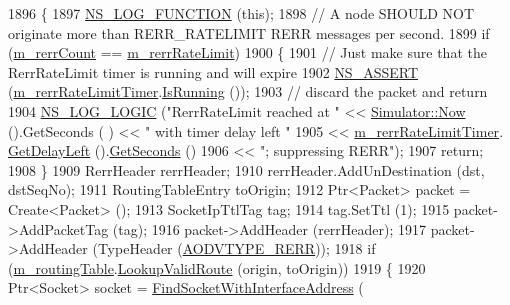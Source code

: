 \begin{DoxyCode}
1896 \{
1897   \hyperlink{log-macros-disabled_8h_a90b90d5bad1f39cb1b64923ea94c0761}{NS\_LOG\_FUNCTION} (\textcolor{keyword}{this});
1898   \textcolor{comment}{// A node SHOULD NOT originate more than RERR\_RATELIMIT RERR messages per second.}
1899   \textcolor{keywordflow}{if} (\hyperlink{classns3_1_1aodv_1_1RoutingProtocol_a4afc71535ffd2ea1bd7dcb03e3fd4233}{m\_rerrCount} == \hyperlink{classns3_1_1aodv_1_1RoutingProtocol_ad7a69761e61bcea41a2bc87ad8928e2d}{m\_rerrRateLimit})
1900     \{
1901       \textcolor{comment}{// Just make sure that the RerrRateLimit timer is running and will expire}
1902       \hyperlink{assert_8h_a6dccdb0de9b252f60088ce281c49d052}{NS\_ASSERT} (\hyperlink{classns3_1_1aodv_1_1RoutingProtocol_a0eaa679b6dea15e92c550591eabbccc1}{m\_rerrRateLimitTimer}.\hyperlink{classns3_1_1Timer_addbc6c740f21ddeb6ad358557962b24c}{IsRunning} ());
1903       \textcolor{comment}{// discard the packet and return}
1904       \hyperlink{group__logging_ga88acd260151caf2db9c0fc84997f45ce}{NS\_LOG\_LOGIC} (\textcolor{stringliteral}{"RerrRateLimit reached at "} << \hyperlink{classns3_1_1Simulator_ac3178fa975b419f7875e7105be122800}{Simulator::Now} ().GetSeconds (
      ) << \textcolor{stringliteral}{" with timer delay left "} 
1905                                                 << \hyperlink{classns3_1_1aodv_1_1RoutingProtocol_a0eaa679b6dea15e92c550591eabbccc1}{m\_rerrRateLimitTimer}.
      \hyperlink{classns3_1_1Timer_a0dc288dd3de21a524d088fc8a5a14a73}{GetDelayLeft} ().\hyperlink{classns3_1_1Time_a8f20d5c3b0902d7b4320982f340b57c8}{GetSeconds} ()
1906                                                 << \textcolor{stringliteral}{"; suppressing RERR"});
1907       \textcolor{keywordflow}{return};
1908     \}
1909   RerrHeader rerrHeader;
1910   rerrHeader.AddUnDestination (dst, dstSeqNo);
1911   RoutingTableEntry toOrigin;
1912   Ptr<Packet> packet = Create<Packet> ();
1913   SocketIpTtlTag tag;
1914   tag.SetTtl (1);
1915   packet->AddPacketTag (tag);
1916   packet->AddHeader (rerrHeader);
1917   packet->AddHeader (TypeHeader (\hyperlink{namespacens3_1_1aodv_a8cf417608302ba0ed75225c976944d44a363aea0c29a02f5899cf088654c6d844}{AODVTYPE\_RERR}));
1918   \textcolor{keywordflow}{if} (\hyperlink{classns3_1_1aodv_1_1RoutingProtocol_a4e1003a34c8adc96db71096d88c98ae0}{m\_routingTable}.\hyperlink{classns3_1_1aodv_1_1RoutingTable_a2ca8c3757223d681d4cc39e2028fa7ad}{LookupValidRoute} (origin, toOrigin))
1919     \{
1920       Ptr<Socket> socket = \hyperlink{classns3_1_1aodv_1_1RoutingProtocol_a7cebc7baa398569f432ea2521310dffe}{FindSocketWithInterfaceAddress} (

\end{DoxyCode}
